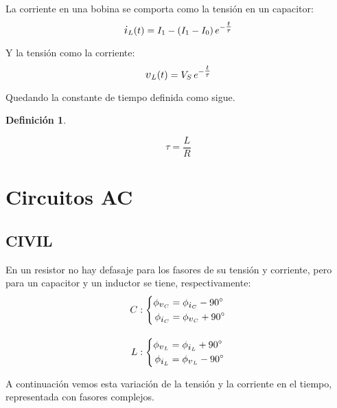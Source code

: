 \documentclass[a5paper,12pt,twoside]{book}
\newtheorem{defn}{{Definición}}[chapter]
\begin{document}
La corriente en una bobina se comporta como la tensión en un capacitor:
\begin{equation*}
    \current_L(t) = I_1 - \bb{I_1 - I_0} e^{-\tfrac{t}{\tau}}
\end{equation*}

Y la tensión como la corriente:
\begin{equation*}
    \voltage_L(t) = V_S \, e^{-\tfrac{t}{\tau}}
\end{equation*}

Quedando la constante de tiempo definida como sigue.

\begin{mdframed}[style=MyFrame1]
    \begin{defn}
    \end{defn}
    \begin{equation*}
        \tau = \frac{L}{R}
    \end{equation*}
\end{mdframed}


\chapter{Circuitos AC}


\section{CIVIL}

En un resistor no hay defasaje para los fasores de su tensión y corriente, pero para un capacitor y un inductor se tiene, respectivamente:
\begin{gather*}
    C: \left\{
    \begin{aligned}
        \phi_{\voltage_C} &= \phi_{\current_C} - \ang{90}
        \\
        \phi_{\current_C} &= \phi_{\voltage_C} + \ang{90}
    \end{aligned}
    \right.
    \\[1em]
    L: \left\{
    \begin{aligned}
        \phi_{\voltage_L} &= \phi_{\current_L} + \ang{90}
        \\
        \phi_{\current_L} &= \phi_{\voltage_L} - \ang{90}
    \end{aligned}
    \right.
\end{gather*}

A continuación vemos esta variación de la tensión y la corriente en el tiempo, representada con fasores complejos.
\end{document}
